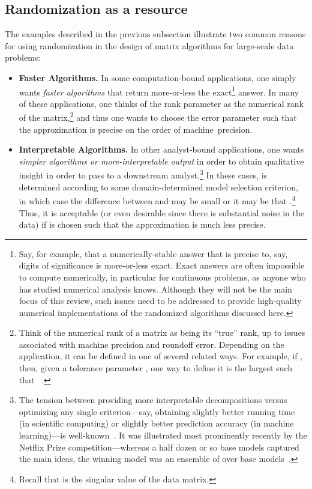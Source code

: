 \documentclass[twoside]{article}
\begin{document}
\subsection{Randomization as a resource}
\label{sxn:background1-resource}

The examples described in the previous subsection illustrate two common reasons 
for using randomization in the design of matrix algorithms for large-scale
data problems:
\begin{itemize}
\item
\textbf{Faster Algorithms.}
In some computation-bound applications, one simply wants \emph{faster 
algorithms} that return more-or-less the exact\footnote{Say, for example, that a numerically-stable answer that is precise to, say, 
 digits of significance is more-or-less exact.  Exact answers are often 
impossible to compute numerically, in particular for continuous problems, as 
anyone who has studied numerical analysis knows.  Although they will not be 
the main focus of this review, such issues need to be addressed to provide 
high-quality numerical implementations of the randomized algorithms 
discussed here.}
answer.
In many of these applications, one thinks of the rank parameter  as the
numerical rank of the matrix,\footnote{Think of the numerical rank of a matrix as being its ``true'' 
rank, up to issues associated with machine precision and roundoff error.  
Depending on the application, it can be defined in one of several related 
ways.  For example, if , then, given a tolerance parameter 
, one way to define it is the largest  such that 
~\cite{GVL96}.}
and thus one wants to choose the error parameter  such 
that the approximation is precise on the order of machine~precision.
\item
\textbf{Interpretable Algorithms.}
In other analyst-bound applications, one wants \emph{simpler 
algorithms or more-interpretable output} in order to obtain qualitative 
insight in order to pass to a downstream analyst.\footnote{The tension between providing more interpretable decompositions 
versus optimizing any single criterion---say, obtaining slightly better 
running time (in scientific computing) or slightly better prediction 
accuracy (in machine learning)---is well-known~\cite{CUR_PNAS}.  
It was illustrated most prominently recently by the Netflix Prize 
competition---whereas a half dozen or so base models captured the main 
ideas, the winning model was an ensemble of over  base 
models~\cite{KBV09}.}
In these cases,  is determined according to some domain-determined model 
selection criterion, in which case the difference between  and 
 may be small or it may be that .\footnote{Recall that  is the  singular value of the data matrix.}
Thus, it is acceptable (or even desirable since there is substantial noise in the data) 
if  is chosen such that the approximation is much less precise.  
\end{itemize}
\end{document}
